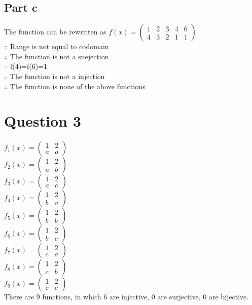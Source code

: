 \documentclass[11pt, oneside]{article}   	%
\begin{document}
\subsection*{Part c}
The function can be rewritten as $f(x)=\begin{pmatrix} 1 & 2 & 3 & 4 & 6 \\ 4 & 3 & 2 & 1 & 1 \end{pmatrix}$\\
$\because$ Range is not equal to codomain\\
$\therefore$ The function is not a suejection\\
$\because$ f(4)=f(6)=1\\
$\therefore$ The function is not a injection\\
$\therefore$ The function is none of the above functions


\section*{Question 3}

	$f_{1}(x)=\begin{pmatrix} 1 & 2 \\ a & a \end{pmatrix}$\\
	$f_{2}(x)=\begin{pmatrix} 1 & 2 \\ a & b \end{pmatrix}$\\
	$f_{3}(x)=\begin{pmatrix} 1 & 2 \\ a & c \end{pmatrix}$\\
	$f_{4}(x)=\begin{pmatrix} 1 & 2 \\ b & a \end{pmatrix}$\\
	$f_{5}(x)=\begin{pmatrix} 1 & 2 \\ b & b \end{pmatrix}$\\
	$f_{6}(x)=\begin{pmatrix} 1 & 2 \\ b & c \end{pmatrix}$\\
	$f_{7}(x)=\begin{pmatrix} 1 & 2 \\ c & a \end{pmatrix}$\\
	$f_{8}(x)=\begin{pmatrix} 1 & 2 \\ c & b \end{pmatrix}$\\
	$f_{9}(x)=\begin{pmatrix} 1 & 2 \\ c & c \end{pmatrix}$\\
	There are 9 functions, in which 6 are injective, 0 are surjective, 0 are bijective.
\end{document}
